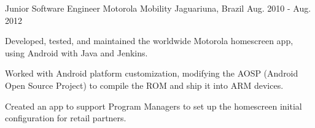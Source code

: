 \begin{cventries}
  \cventry
    {Junior Software Engineer} %
    {Motorola Mobility} %
    {Jaguariuna, Brazil} %
    {Aug. 2010 - Aug. 2012} %
    {
      \begin{cvitems} %
        \item {Developed, tested, and maintained the worldwide Motorola homescreen app, using Android with Java and Jenkins.}
        \item {Worked with Android platform customization, modifying the AOSP (Android Open Source Project) to compile the ROM and ship it into ARM devices.}
        \item {Created an app to support Program Managers to set up the homescreen initial configuration for retail partners.}
      \end{cvitems}
    }

\end{cventries}
